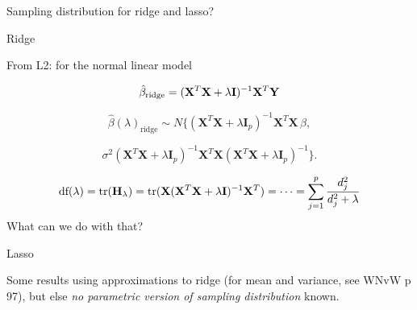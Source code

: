 \documentclass[
  ignorenonframetext,
]{beamer}
\begin{document}
\begin{frame}

\begin{block}{Sampling distribution for ridge and lasso?}

\begin{block}{Ridge}

From L2: for the normal linear model

\[ \hat{\beta}_{\text{ridge}}=({\bf X}^T{\bf X}+\lambda {\bf I})^{-1} {\bf X}^T {\bf Y}\]

\[\hat{\beta}(\lambda)_{\text{ridge}} \sim N \{ (\mathbf{X}^T \mathbf{X} + \lambda \mathbf{I}_{p})^{-1} \mathbf{X}^T \mathbf{X} \, \beta,\]

\[\sigma^2 ( \mathbf{X}^T \mathbf{X} + \lambda \mathbf{I}_{p} )^{-1}  \mathbf{X}^T \mathbf{X} ( \mathbf{X}^T \mathbf{X} + \lambda \mathbf{I}_{p} )^{-1}  \}.\]

\[\text{df}(\lambda)=\text{tr}({\bf H}_{\lambda})=\text{tr}({\bf X}({\bf X}^T{\bf X}+ \lambda {\bf I})^{-1}{\bf X}^T)=\cdots=\sum_{j=1}^p \frac{d_j^2}{d_j^2+\lambda}\]
What can we do with that?

\end{block}

\end{block}

\end{frame}

\begin{frame}

\end{frame}

\begin{frame}

\begin{block}{Lasso}

Some results using approximations to ridge (for mean and variance, see
WNvW p 97), but else \emph{no parametric version of sampling
distribution} known.

\end{block}

\end{frame}
\end{document}
